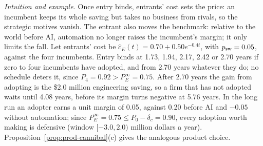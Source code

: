 \noindent\emph{Intuition and example.} Once entry binds, entrants' cost sets the price: an incumbent keeps its whole saving but takes no business from rivals, so the strategic motives vanish. The entrant also moves the benchmark: relative to the world before AI, automation no longer raises the incumbent's margin; it only limits the fall. Let entrants' cost be $\hat c_E(t)=0.70+0.50e^{-0.4t}$, with $p_{\rm sw}=0.05$, against the four incumbents. Entry binds at 1.73, 1.94, 2.17, 2.42 or 2.70 years if zero to four incumbents have adopted, and from 2.70 years whatever they do; no schedule deters it, since $P_4=0.92>P_E^\infty=0.75$. After 2.70 years the gain from adopting is the \$2.0 million engineering saving, so a firm that has not adopted waits until 4.08 years, before its margin turns negative at 5.76 years. In the long run an adopter earns a unit margin of 0.05, against 0.20 before AI and $-0.05$ without automation; since $P_E^\infty=0.75\le P_0-\delta_c=0.90$, every adoption worth making is defensive (window $[-3.0,2.0)$ million dollars a year). Proposition~\ref{prop:prod-cannibal}(c) gives the analogous product choice.

